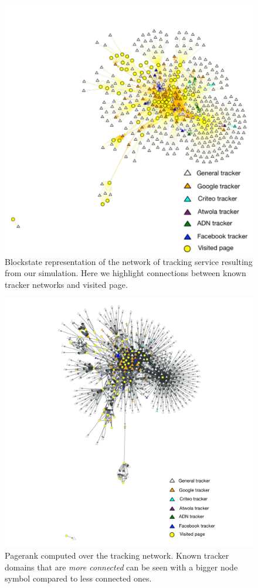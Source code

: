 \begin{figure}
\includegraphics[width=\textwidth]{figures/blockstate.pdf}
\caption{Blockstate representation of the network of tracking service resulting from our simulation. Here we highlight connections between known tracker networks and visited page.}
\label{fig:blockstate}
\end{figure}

\begin{figure}
\includegraphics[width=\textwidth]{figures/pagerank.pdf}
\caption[Pagerank of the trackers network]{Pagerank computed over the tracking network. Known tracker domains that are \emph{more connected} can be seen with a bigger node symbol compared to less connected ones.}
\label{fig:pagerank}
\end{figure}


